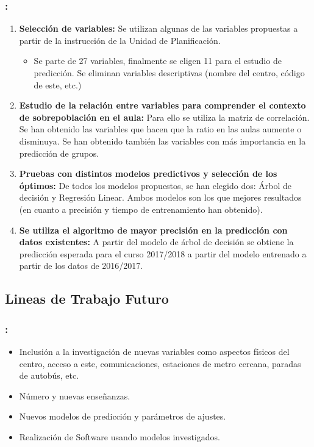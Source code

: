 \documentclass{beamer}
\begin{document}
\begin{frame}[allowframebreaks=1]
\frametitle{\secname : \subsecname}
\begin{enumerate}
	\item \textbf{Selección de variables:} Se utilizan algunas de las variables propuestas a partir de la instrucción de la Unidad de Planificación. \cite{INSTRCONSE}
	\begin{itemize}
		\item Se parte de 27 variables, finalmente se eligen 11 para el estudio de predicción. Se eliminan variables descriptivas (nombre del centro, código de este, etc.)
	\end{itemize}
	\item \textbf{Estudio de la relación entre variables para comprender el contexto de sobrepoblación en el aula:} Para ello se utiliza la matriz de correlación. Se han obtenido las variables que hacen que la ratio en las aulas aumente o disminuya. Se han obtenido también las variables con más importancia en la predicción de grupos.
	\item \textbf{Pruebas con distintos modelos predictivos y selección de los óptimos:} De todos los modelos propuestos, se han elegido dos: Árbol de decisión y Regresión Linear. Ambos modelos son los que mejores resultados (en cuanto a precisión y tiempo de entrenamiento han obtenido).
	\item \textbf{Se utiliza el algoritmo de mayor precisión en la predicción con datos existentes:} A partir del modelo de árbol de decisión se obtiene la predicción esperada para el curso 2017/2018 a partir del modelo entrenado a partir de los datos de 2016/2017.
\end{enumerate}
\end{frame}



\subsection{Lineas de Trabajo Futuro}

\begin{frame}
\frametitle{\secname : \subsecname}
\begin{itemize}
	\item Inclusión a la investigación de nuevas variables como aspectos físicos del centro, acceso a este, comunicaciones, estaciones de metro cercana, paradas de autobús, etc.
	\item Número y nuevas enseñanzas.
	\item Nuevos modelos de predicción y parámetros de ajustes.
	\item Realización de Software usando modelos investigados.
\end{itemize}
\end{frame}
\end{document}
